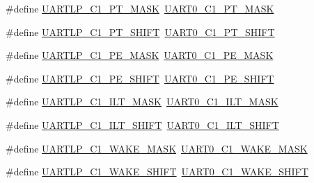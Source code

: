 \begin{DoxyCompactItemize}
\#define \hyperlink{group___backward___compatibility___symbols_ga6f06cd43d0baed63132675d89a9b89ff}{U\+A\+R\+T\+L\+P\+\_\+\+C1\+\_\+\+P\+T\+\_\+\+M\+A\+SK}~\hyperlink{group___u_a_r_t0___register___masks_gaba11d4d0be5a31499a920b0d6904006d}{U\+A\+R\+T0\+\_\+\+C1\+\_\+\+P\+T\+\_\+\+M\+A\+SK}
\item 
\#define \hyperlink{group___backward___compatibility___symbols_ga97ce472c10fd61704932180dc3e26d51}{U\+A\+R\+T\+L\+P\+\_\+\+C1\+\_\+\+P\+T\+\_\+\+S\+H\+I\+FT}~\hyperlink{group___u_a_r_t0___register___masks_ga0e72f6045ea89531d37017231952256b}{U\+A\+R\+T0\+\_\+\+C1\+\_\+\+P\+T\+\_\+\+S\+H\+I\+FT}
\item 
\#define \hyperlink{group___backward___compatibility___symbols_ga23f4f361b83573abfc5cfd6f15ef3a89}{U\+A\+R\+T\+L\+P\+\_\+\+C1\+\_\+\+P\+E\+\_\+\+M\+A\+SK}~\hyperlink{group___u_a_r_t0___register___masks_ga7f5131b82519abb6471ec8054dc8ccef}{U\+A\+R\+T0\+\_\+\+C1\+\_\+\+P\+E\+\_\+\+M\+A\+SK}
\item 
\#define \hyperlink{group___backward___compatibility___symbols_gacce781ed7eeeb5e51a145dfec1848406}{U\+A\+R\+T\+L\+P\+\_\+\+C1\+\_\+\+P\+E\+\_\+\+S\+H\+I\+FT}~\hyperlink{group___u_a_r_t0___register___masks_gad8d18bd21ce855fe14fff0d932059faf}{U\+A\+R\+T0\+\_\+\+C1\+\_\+\+P\+E\+\_\+\+S\+H\+I\+FT}
\item 
\#define \hyperlink{group___backward___compatibility___symbols_ga0efd0cf26f2b583d1b21cc8cc3f487fe}{U\+A\+R\+T\+L\+P\+\_\+\+C1\+\_\+\+I\+L\+T\+\_\+\+M\+A\+SK}~\hyperlink{group___u_a_r_t0___register___masks_ga863c39adcb21a4547a5b9fcf85c06767}{U\+A\+R\+T0\+\_\+\+C1\+\_\+\+I\+L\+T\+\_\+\+M\+A\+SK}
\item 
\#define \hyperlink{group___backward___compatibility___symbols_ga337530c2b176d78ca6c28da4ab325783}{U\+A\+R\+T\+L\+P\+\_\+\+C1\+\_\+\+I\+L\+T\+\_\+\+S\+H\+I\+FT}~\hyperlink{group___u_a_r_t0___register___masks_gaa387ac068b517ea550833cc7353e25fe}{U\+A\+R\+T0\+\_\+\+C1\+\_\+\+I\+L\+T\+\_\+\+S\+H\+I\+FT}
\item 
\#define \hyperlink{group___backward___compatibility___symbols_ga2e69313a76db1ef757860afafa047a76}{U\+A\+R\+T\+L\+P\+\_\+\+C1\+\_\+\+W\+A\+K\+E\+\_\+\+M\+A\+SK}~\hyperlink{group___u_a_r_t0___register___masks_ga1c197c081ab6caac9a511196ca179a12}{U\+A\+R\+T0\+\_\+\+C1\+\_\+\+W\+A\+K\+E\+\_\+\+M\+A\+SK}
\item 
\#define \hyperlink{group___backward___compatibility___symbols_ga4ca5a7f2cdef379d91da768a34275930}{U\+A\+R\+T\+L\+P\+\_\+\+C1\+\_\+\+W\+A\+K\+E\+\_\+\+S\+H\+I\+FT}~\hyperlink{group___u_a_r_t0___register___masks_gab94505f50416420f95a9b016940fb956}{U\+A\+R\+T0\+\_\+\+C1\+\_\+\+W\+A\+K\+E\+\_\+\+S\+H\+I\+FT}

\end{DoxyCompactItemize}
